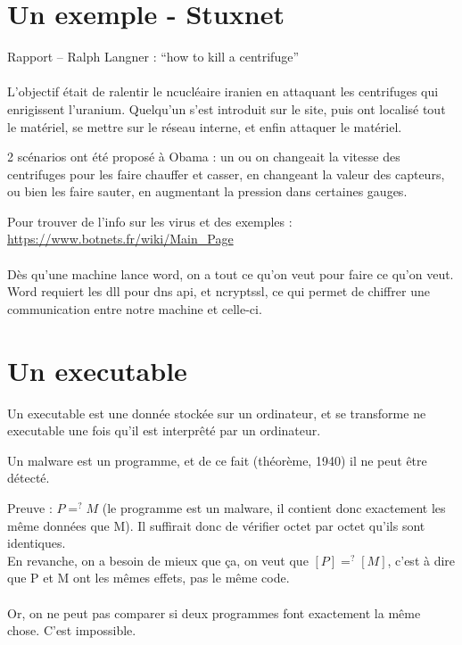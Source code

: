 \documentclass[a4paper,10pt]{article}
\begin{document}
\section{Un exemple - Stuxnet}
\begin{center}
  Rapport -- Ralph Langner : ``how to kill a centrifuge''
\end{center}

\paragraph*{}
L'objectif était de ralentir le ncucléaire iranien en attaquant les centrifuges qui enrigissent l'uranium. Quelqu'un s'est introduit sur le site, puis ont localisé tout le matériel, se mettre sur le réseau interne, et enfin attaquer le matériel.

2 scénarios ont été proposé à Obama : un ou on changeait la vitesse des centrifuges pour les faire chauffer et casser, en changeant la valeur des capteurs, ou bien les faire sauter, en augmentant la pression dans certaines gauges.

Pour trouver de l'info sur les virus et des exemples : \url{https://www.botnets.fr/wiki/Main_Page}

\paragraph*{}
Dès qu'une machine lance word, on a tout ce qu'on veut pour faire ce qu'on veut. Word requiert les dll pour dns api, et ncryptssl, ce qui permet de chiffrer une communication entre notre machine et celle-ci.

\section{Un executable}

Un executable est une donnée stockée sur un ordinateur, et se transforme ne executable une fois qu'il est interprêté par un ordinateur.

Un malware est un programme, et de ce fait (théorème, 1940) il ne peut être détecté.

Preuve :
 $P=^?M$ (le programme est un malware, il contient donc exactement les même données que M). Il suffirait donc de vérifier octet par octet qu'ils sont identiques.\\
 En revanche, on a besoin de mieux que ça, on veut que $\left[P\right] =^? \left[M\right]$, c'est à dire que P et M ont les mêmes effets, pas le même code.
\paragraph*{}
 Or, on ne peut pas comparer si deux programmes font exactement la même chose. C'est impossible.
\end{document}
